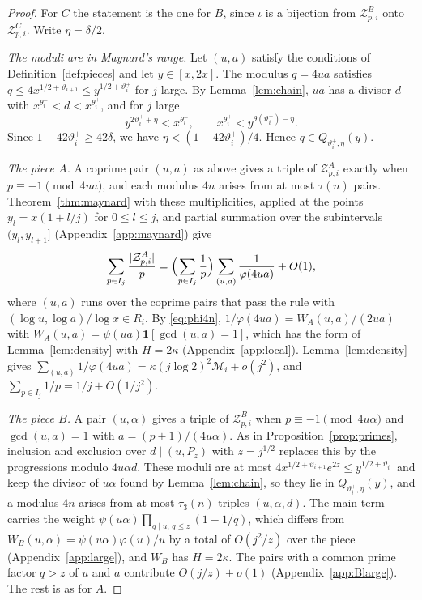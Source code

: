 \documentclass[aps,prd,twocolumn,superscriptaddress,nofootinbib,longbibliography,floatfix,showkeys,nobalancelastpage,amsmath,amssymb,10pt]{revtex4-2}
\theoremstyle{plain}
\theoremstyle{definition}
\theoremstyle{plain}
\newcommand{\Zc}{\mathcal{Z}}
\newcommand{\Mc}{\mathcal{M}}
\newcommand{\one}{\mathbf{1}}
\begin{document}
\begin{proof}
For $C$ the statement is the one for $B$, since $\iota$ is a bijection from $\Zc^B_{p,i}$ onto $\Zc^C_{p,i}$. Write $\eta=\delta/2$.

\emph{The moduli are in Maynard's range.} Let $(u,a)$ satisfy the conditions of Definition~\ref{def:pieces} and let $y\in[x,2x]$. The modulus $q=4ua$ satisfies $q\le4x^{1/2+\vartheta_{i+1}}\le y^{1/2+\vartheta_i^+}$ for $j$ large. By Lemma~\ref{lem:chain}, $ua$ has a divisor $d$ with $x^{\theta_i^-}<d<x^{\theta_i^+}$, and for $j$ large
\[
y^{2\vartheta_i^++\eta}<x^{\theta_i^-},\qquad x^{\theta_i^+}<y^{\theta(\vartheta_i^+)-\eta}.
\]
Since $1-42\vartheta_i^+\ge42\delta$, we have $\eta<(1-42\vartheta_i^+)/4$. Hence $q\in Q_{\vartheta_i^+,\eta}(y)$.

\emph{The piece $A$.} A coprime pair $(u,a)$ as above gives a triple of $\Zc^A_{p,i}$ exactly when $p\equiv-1\pmod{4ua}$, and each modulus $4n$ arises from at most $\tau(n)$ pairs. Theorem~\ref{thm:maynard} with these multiplicities, applied at the points $y_l=x(1+l/j)$ for $0\le l\le j$, and partial summation over the subintervals $(y_l,y_{l+1}]$ (Appendix~\ref{app:maynard}) give
\[
\sum_{p\in I_j}\frac{|\Zc^A_{p,i}|}p=\Bigl(\sum_{p\in I_j}\frac1p\Bigr)\sum_{(u,a)}\frac1{\varphi(4ua)}+O(1),
\]
where $(u,a)$ runs over the coprime pairs that pass the rule with $(\log u,\log a)/\log x\in R_i$. By \eqref{eq:phi4n}, $1/\varphi(4ua)=W_A(u,a)/(2ua)$ with $W_A(u,a)=\psi(ua)\one[\gcd(u,a)=1]$, which has the form of Lemma~\ref{lem:density} with $H=2\kappa$ (Appendix~\ref{app:local}). Lemma~\ref{lem:density} gives $\sum_{(u,a)}1/\varphi(4ua)=\kappa(j\log2)^2\Mc_i+o(j^2)$, and $\sum_{p\in I_j}1/p=1/j+O(1/j^2)$.

\emph{The piece $B$.} A pair $(u,\alpha)$ gives a triple of $\Zc^B_{p,i}$ when $p\equiv-1\pmod{4u\alpha}$ and $\gcd(u,a)=1$ with $a=(p+1)/(4u\alpha)$. As in Proposition~\ref{prop:primes}, inclusion and exclusion over $d\mid(u,P_z)$ with $z=j^{1/2}$ replaces this by the progressions modulo $4u\alpha d$. These moduli are at most $4x^{1/2+\vartheta_{i+1}}e^{2z}\le y^{1/2+\vartheta_i^+}$ and keep the divisor of $u\alpha$ found by Lemma~\ref{lem:chain}, so they lie in $Q_{\vartheta_i^+,\eta}(y)$, and a modulus $4n$ arises from at most $\tau_3(n)$ triples $(u,\alpha,d)$. The main term carries the weight $\psi(u\alpha)\prod_{q\mid u,\,q\le z}(1-1/q)$, which differs from $W_B(u,\alpha)=\psi(u\alpha)\varphi(u)/u$ by a total of $O(j^2/z)$ over the piece (Appendix~\ref{app:large}), and $W_B$ has $H=2\kappa$. The pairs with a common prime factor $q>z$ of $u$ and $a$ contribute $O(j/z)+o(1)$ (Appendix~\ref{app:Blarge}). The rest is as for $A$.
\end{proof}
\end{document}

